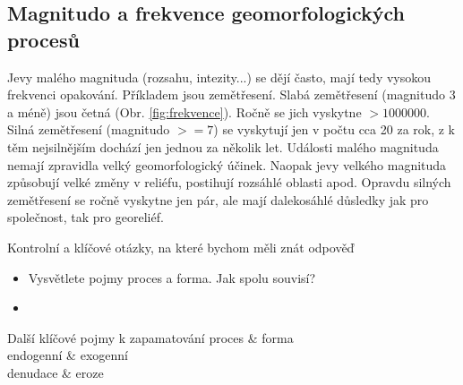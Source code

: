 \subsection{Magnitudo a frekvence geomorfologických procesů}
Jevy malého magnituda (rozsahu, intezity...) se dějí často, mají tedy vysokou frekvenci opakování. Příkladem jsou zemětřesení. Slabá zemětřesení (magnitudo 3 a méně) jsou četná (Obr. \ref{fig:frekvence}). Ročně se jich vyskytne $> 1000000$. Silná zemětřesení (magnitudo $>=7$) se vyskytují jen v počtu cca 20 za rok, z k těm nejsilnějším dochází jen jednou za několik let. 
Události malého magnituda nemají zpravidla velký geomorfologický účinek. Naopak jevy velkého magnituda způsobují velké změny v reliéfu, postihují rozsáhlé oblasti apod. Opravdu silných zemětřesení se ročně vyskytne jen pár, ale mají dalekosáhlé důsledky jak pro společnost, tak pro georeliéf.



\newpage
\onecolumn
\begin{boxotazky}{Kontrolní a klíčové otázky, na které bychom měli znát odpověď}
	\begin{itemize}
		\item Vysvětlete pojmy proces a forma. Jak spolu souvisí?
		\item 
		
	\end{itemize}
\end{boxotazky}

\begin{boxslovnik}{Další klíčové pojmy k zapamatování}
	proces & forma \\
	endogenní & exogenní \\
	denudace & eroze
\end{boxslovnik}
\twocolumn